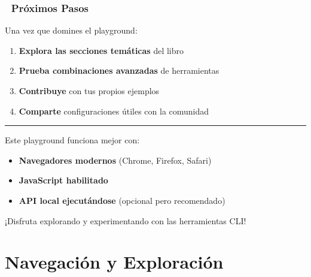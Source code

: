 \documentclass[
  11pt,
  letterpaper,
  oneside,
  openany]{scrbook}
\providecommand{\tightlist}{%
  \setlength{\itemsep}{0pt}\setlength{\parskip}{0pt}}
\begin{document}
\section{🚀 Próximos Pasos}\label{pruxf3ximos-pasos}

Una vez que domines el playground:

\begin{enumerate}
\def\labelenumi{\arabic{enumi}.}
\tightlist
\item
  \textbf{Explora las secciones temáticas} del libro
\item
  \textbf{Prueba combinaciones avanzadas} de herramientas
\item
  \textbf{Contribuye} con tus propios ejemplos
\item
  \textbf{Comparte} configuraciones útiles con la comunidad
\end{enumerate}

\begin{center}\rule{0.5\linewidth}{0.5pt}\end{center}

\begin{tcolorbox}[enhanced jigsaw, coltitle=black, breakable, arc=.35mm, toprule=.15mm, colbacktitle=quarto-callout-important-color!10!white, colframe=quarto-callout-important-color-frame, opacityback=0, colback=white, bottomtitle=1mm, bottomrule=.15mm, rightrule=.15mm, left=2mm, toptitle=1mm, leftrule=.75mm, title=\textcolor{quarto-callout-important-color}{\faExclamation}\hspace{0.5em}{¡Importante!}, titlerule=0mm, opacitybacktitle=0.6]

Este playground funciona mejor con:

\begin{itemize}
\tightlist
\item
  \textbf{Navegadores modernos} (Chrome, Firefox, Safari)
\item
  \textbf{JavaScript habilitado}
\item
  \textbf{API local ejecutándose} (opcional pero recomendado)
\end{itemize}

\end{tcolorbox}

¡Disfruta explorando y experimentando con las herramientas CLI! 🎉

\part{Navegación y Exploración}
\end{document}
